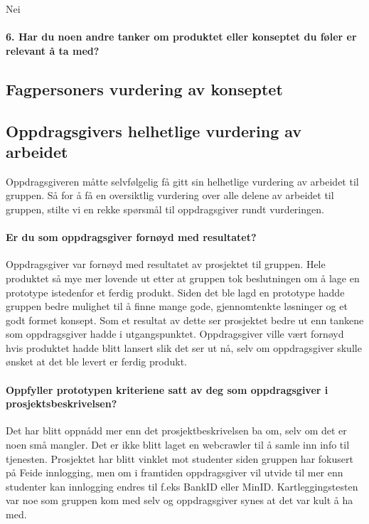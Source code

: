 Nei

\paragraph{6. Har du noen andre tanker om produktet eller konseptet du føler er relevant å ta med?}


\subsection{Fagpersoners vurdering av konseptet}


\subsection{Oppdragsgivers helhetlige vurdering av arbeidet}
Oppdragsgiveren måtte selvfølgelig få gitt sin helhetlige vurdering av arbeidet til gruppen. Så for å få en oversiktlig vurdering over alle delene av arbeidet til gruppen, stilte vi en rekke spørsmål til oppdragsgiver rundt vurderingen. 

\paragraph{Er du som oppdragsgiver fornøyd med resultatet?}
Oppdragsgiver var fornøyd med resultatet av prosjektet til gruppen. Hele produktet så mye mer lovende ut etter at gruppen tok beslutningen om å lage en prototype istedenfor et ferdig produkt. Siden det ble lagd en prototype hadde gruppen bedre mulighet til å finne mange gode, gjennomtenkte løsninger og et godt formet konsept. Som et resultat av dette ser prosjektet bedre ut enn tankene som oppdragsgiver hadde i utgangspunktet. Oppdragsgiver ville vært fornøyd hvis produktet hadde blitt lansert slik det ser ut nå, selv om oppdragsgiver skulle ønsket at det ble levert er ferdig produkt.

\paragraph{Oppfyller prototypen kriteriene satt av deg som oppdragsgiver i prosjektsbeskrivelsen?}
Det har blitt oppnådd mer enn det prosjektbeskrivelsen ba om, selv om det er noen små mangler. Det er ikke blitt laget en webcrawler til å samle inn info til tjenesten. Prosjektet har blitt vinklet mot studenter siden gruppen har fokusert på Feide innlogging, men om i framtiden oppdragsgiver vil utvide til mer enn studenter kan innlogging endres til f.eks BankID eller MinID. Kartleggingstesten var noe som gruppen kom med selv og oppdragsgiver synes at det var kult å ha med. 

